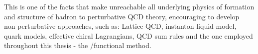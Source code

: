 This is one of the facts that make unreachable all underlying physics of formation and structure of hadron to perturbative QCD theory, encouraging to develop non-perturbative approaches, such as: Lattice QCD, instanton liquid model, quark models, effective chiral Lagrangians, QCD sum rules and the one employed throughout this thesis - the \DS/\BS  functional method.

%
